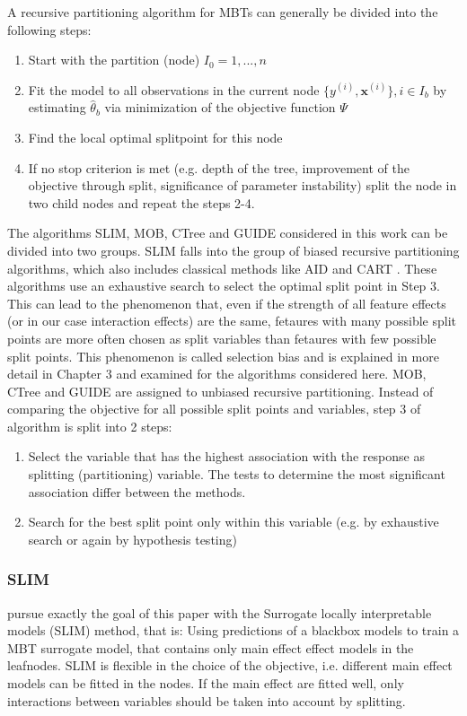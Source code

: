 A recursive partitioning algorithm for MBTs can generally be divided into the following steps:
\begin{enumerate}
    \item Start with the partition (node) $I_0 = 1,...,n$
    \item Fit the model to all observations in the current node $\{y^{(i)}, \mathbf{x}^{(i)}\}, i \in I_b$ by estimating $\hat{\theta}_b$ via minimization of the objective function $\Psi$
    \item Find the local optimal splitpoint for this node 
    \item If no stop criterion is met (e.g. depth of the tree, improvement of the objective through split, significance of parameter instability) split the node in two child nodes and repeat the steps 2-4.
\end{enumerate}


The algorithms SLIM, MOB, CTree and GUIDE considered in this work can be divided into two groups. SLIM falls into the group of biased recursive partitioning algorithms, which also includes classical methods like AID \citep{Morgan.1963} and CART \citep{Breiman.1984}. These algorithms use an exhaustive search to select the optimal split point in Step 3. This can lead to the phenomenon that, even if the strength of all feature effects (or in our case interaction effects) are the same, fetaures with many possible split points are more often chosen as split variables than fetaures with few possible split points. This phenomenon is called selection bias and is explained in more detail in Chapter 3 and examined for the algorithms considered here.
MOB, CTree and GUIDE are assigned to unbiased recursive partitioning. Instead of comparing the objective for all possible split points and variables, step 3 of algorithm is split into 2 steps:

\begin{enumerate}
    \item Select the variable that has the highest association with the response as splitting (partitioning) variable. The tests to determine the most significant association differ between the methods.
    \item Search for the best split point only within this variable (e.g. by exhaustive search or again by hypothesis testing)
\end{enumerate}

\citep{Schlosser.2019}



\subsubsection{SLIM}
\citep{Hu.2020} pursue exactly the goal of this paper with the Surrogate locally interpretable models (SLIM) method, that is: Using predictions of a blackbox models to train a MBT surrogate model, that contains only main effect effect models in the leafnodes. SLIM is flexible in the choice of the objective, i.e. different main effect models can be fitted in the nodes. If the main effect are fitted well, only interactions between variables should be taken into account by splitting. 

